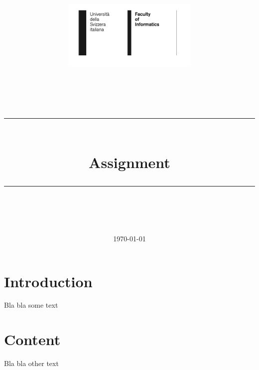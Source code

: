 \documentclass[11pt]{scrartcl}
\title{	
  \vspace{-2.8cm}
  \begin{figure}[H]
      \hspace{-1cm}
    \includegraphics[width=65mm]{usi-inf-logo.png}
  \end{figure}
  \vspace{-0.2cm}

	\normalfont\large
	\textsc{\thecourse}\\
	\vspace{0.1cm}

	\rule{\linewidth}{0.5pt}\\
	\vspace{0.4cm}
	{\huge Assignment \theassnumber}\\
	\vspace{0.2cm}
	\rule{\linewidth}{0.5pt}\\
  \vspace{-0.1cm}
}
\author{\LARGE \thestudent}
\date{\normalsize\today}
\renewcommand{\texttt}[1]{%
  \begingroup
  \ttfamily
  \begingroup\lccode`~=`/\lowercase{\endgroup\def~}{/\discretionary{}{}{}}%
  \begingroup\lccode`~=`[\lowercase{\endgroup\def~}{[\discretionary{}{}{}}%
  \begingroup\lccode`~=`.\lowercase{\endgroup\def~}{.\discretionary{}{}{}}%
  \catcode`/=\active\catcode`[=\active\catcode`.=\active
  \scantokens{#1\noexpand}%
  \endgroup
}
\begin{document}
\maketitle











\section{Introduction}

Bla bla some text


\newpage
\section{Content}

Bla bla other text
\end{document}
